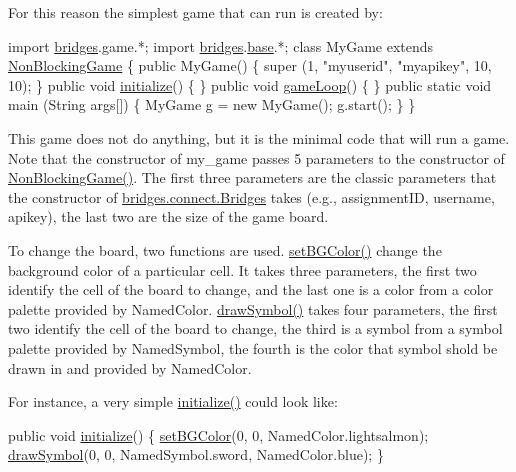 For this reason the simplest game that can run is created by\+:


\begin{DoxyCode}
\textcolor{keyword}{import} \hyperlink{namespacebridges}{bridges}.game.*;
\textcolor{keyword}{import} \hyperlink{namespacebridges}{bridges}.\hyperlink{namespacebridges_1_1base}{base}.*;
\textcolor{keyword}{class }MyGame \textcolor{keyword}{extends} \hyperlink{classbridges_1_1games_1_1_non_blocking_game_ae85ea8dcc355372ba354f4e26323fb76}{NonBlockingGame} \{
  \textcolor{keyword}{public} MyGame() \{ super (1, \textcolor{stringliteral}{"myuserid"},  \textcolor{stringliteral}{"myapikey"}, 10, 10); \}
  \textcolor{keyword}{public} \textcolor{keywordtype}{void} \hyperlink{classbridges_1_1games_1_1_game_base_a973a52d5eee7c29b01d668fba3c61657}{initialize}()  \{ \}
  \textcolor{keyword}{public} \textcolor{keywordtype}{void} \hyperlink{classbridges_1_1games_1_1_game_base_a56d05ed744791cfc1c3792f39ff438f1}{gameLoop}()  \{ \}
  \textcolor{keyword}{public} \textcolor{keyword}{static} \textcolor{keywordtype}{void}  main (String args[]) \{
    MyGame g = \textcolor{keyword}{new} MyGame();
    g.start();
  \}
\}
\end{DoxyCode}


This game does not do anything, but it is the minimal code that will run a game. Note that the constructor of my\+\_\+game passes 5 parameters to the constructor of \hyperlink{classbridges_1_1games_1_1_non_blocking_game_ae85ea8dcc355372ba354f4e26323fb76}{Non\+Blocking\+Game()}. The first three parameters are the classic parameters that the constructor of \hyperlink{classbridges_1_1connect_1_1_bridges}{bridges.\+connect.\+Bridges} takes (e.\+g., assignment\+ID, username, apikey), the last two are the size of the game board.

To change the board, two functions are used. \hyperlink{classbridges_1_1games_1_1_game_base_a7b4d08cdb306a5bf7104ab5315acb414}{set\+B\+G\+Color()} change the background color of a particular cell. It takes three parameters, the first two identify the cell of the board to change, and the last one is a color from a color palette provided by Named\+Color. \hyperlink{classbridges_1_1games_1_1_game_base_a03e8446feb00d5957a7e160a4fa76342}{draw\+Symbol()} takes four parameters, the first two identify the cell of the board to change, the third is a symbol from a symbol palette provided by Named\+Symbol, the fourth is the color that symbol shold be drawn in and provided by Named\+Color.

For instance, a very simple \hyperlink{classbridges_1_1games_1_1_game_base_a973a52d5eee7c29b01d668fba3c61657}{initialize()} could look like\+: 
\begin{DoxyCode}
\textcolor{keyword}{public} \textcolor{keywordtype}{void} \hyperlink{classbridges_1_1games_1_1_game_base_a973a52d5eee7c29b01d668fba3c61657}{initialize}() \{
  \hyperlink{classbridges_1_1games_1_1_game_base_a7b4d08cdb306a5bf7104ab5315acb414}{setBGColor}(0, 0, NamedColor.lightsalmon);
  \hyperlink{classbridges_1_1games_1_1_game_base_a03e8446feb00d5957a7e160a4fa76342}{drawSymbol}(0, 0, NamedSymbol.sword, NamedColor.blue);
\}
\end{DoxyCode}


